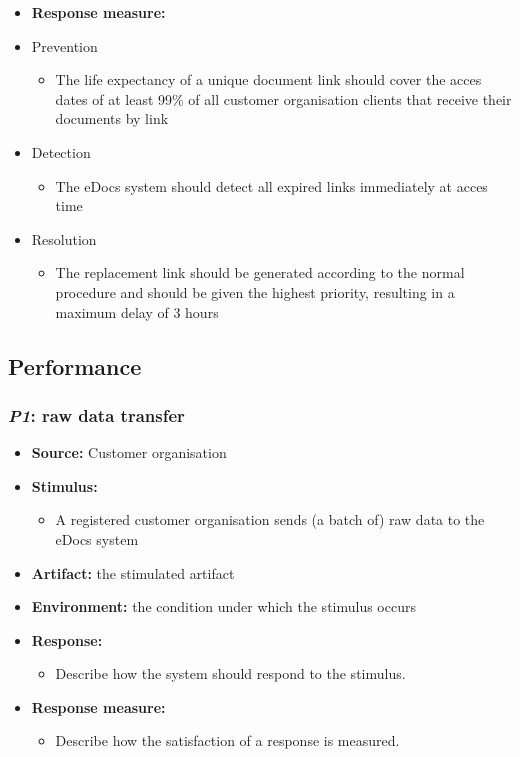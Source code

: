 \documentclass[a4paper,10pt]{article}
\begin{document}
\begin{itemize}
    \item \textbf{Response measure:}
            \item Prevention
		\begin{itemize}
			\item The life expectancy of a unique document link should cover the acces dates of at least 99\% of all customer organisation clients that receive their documents by link
		\end{itemize}
            \item Detection
		\begin{itemize}
			\item The eDocs system should detect all expired links immediately at acces time
		\end{itemize}
            \item Resolution
		\begin{itemize}
			\item The replacement link should be generated according to the normal procedure and should be given the highest priority, resulting in a maximum delay of 3 hours
		\end{itemize}
\end{itemize}

\subsection{Performance}
\subsubsection{\emph{P1}: raw data transfer }


\begin{itemize}
    \item \textbf{Source:} Customer organisation
    \item \textbf{Stimulus:}
        \begin{itemize}
            \item A registered customer organisation sends (a batch of) raw data to the eDocs system
        \end{itemize}

    \item \textbf{Artifact:} the stimulated artifact
    \item \textbf{Environment:} the condition under which the stimulus occurs
    \item \textbf{Response:}
        \begin{itemize}
            \item Describe how the system should respond to the stimulus.
        \end{itemize}

    \item \textbf{Response measure:}
        \begin{itemize}
            \item Describe how the satisfaction of a response is measured.
        \end{itemize}
\end{itemize}
\end{document}
